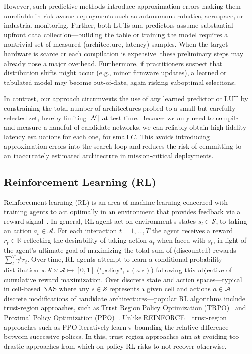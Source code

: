 However, such predictive methods introduce approximation errors making them unreliable in risk-averse deployments such as autonomous robotics, aerospace, or industrial monitoring.
Further, both LUTs and predictors assume substantial upfront data collection---building the table or training the model requires a nontrivial set of measured (architecture, latency) samples. When the target hardware is scarce or each compilation is expensive, these preliminary steps may already pose a major overhead. Furthermore, if practitioners suspect that distribution shifts might occur (e.g., minor firmware updates), a learned or tabulated model may become out-of-date, again risking suboptimal selections.

In contrast, our approach circumvents the use of any learned predictor or LUT by constraining the total number of architectures probed to a small but carefully selected set, hereby limiting \( \vert \mathcal N \vert \) at test time. 
Because we only need to compile and measure a handful of candidate networks, we can reliably obtain high-fidelity latency evaluations for each one, for small \( C \). 
This avoids introducing approximation errors into the search loop and reduces the risk of committing to an inaccurately estimated architecture in mission-critical deployments.

\subsection{Reinforcement Learning (RL)}
Reinforcement learning (RL) is an area of machine learning concerned with training agents to act optimally in an environment that provides feedback via a reward signal~\citep{sutton1998reinforcement}. 
In general, RL agent act on environment's states \(s_t \in \mathcal S \), to taking an action \(a_t \in \mathcal A \). 
For each interaction \(t=1, \dots, T \) the agent receives a reward \(r_t \in \mathbb R\) reflecting the desirability of taking action \( a_t \) when faced with \( s_t \), in light of the agent's ultimate goal of maximizing the total sum of (discounted) rewards \(\sum_t^T \gamma^t r_t \).
Over time, RL agents attempt to learn a conditional probability distribution \(\pi: \mathcal S \times \mathcal A \mapsto [0, 1] \) ("policy", \(\pi(a \vert s)\)) following this objective of cumulative reward maximization.
Over discrete state and action spaces---typical in cell-based NAS where any \( s \in \mathcal S \) represents a given cell and actions \( a \in \mathcal A \) discrete modifications of candidate architectures---popular RL algorithms include trust-region approaches, such as Trust Region Policy Optimization (TRPO)~\citep{schulman2015trust} and Proximal Policy Optimization (PPO)~\citep{schulman2017proximal}.
Unlike REINFORCE~\citep{zoph2016neural}, trust-region approaches such as PPO iteratively learn \( \pi \) bounding the relative difference between successive polices. In this, trust-region approaches aim at avoiding too drastic approaches from which on-policy RL risks to not recover otherwise.

